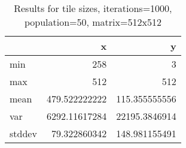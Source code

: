 \documentclass{article}
\begin{document}
\begin{table}
  \centering
  \begin{tabular}{l|r|r}
    & x & y \\ \hline
    min & 258 & 3 \\
    max & 512 & 512 \\
    mean & 479.522222222 & 115.355555556 \\
    var & 6292.11617284 & 22195.3846914 \\
    stddev & 79.322860342 & 148.981155491 \\
  \end{tabular}
  \caption{Results for tile sizes, iterations=1000, population=50, matrix=512x512}
  \label{table:tiledmul_1000_50_512x512}
\end{table}
  
\end{document}
